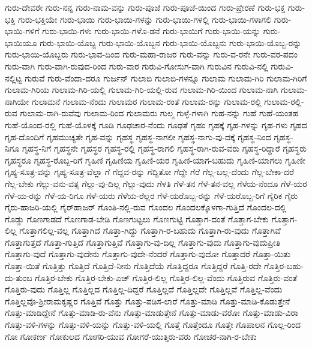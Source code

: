 {ಗುರು-ದೇವರೇ
ಗುರು-ನನ್ನ
ಗುರು-ನಾಮ-ವನ್ನು
ಗುರು-ಪೂಜೆ
ಗುರು-ಪೂಜೆ-ಯಿಂದ
ಗುರು-ಪ್ರೇರಣೆ
ಗುರು-ಭಕ್ತ
ಗುರು-ಭಕ್ತಿ
ಗುರು-ಭಕ್ತಿಯೇ
ಗುರು-ಭಾಯಿ
ಗುರು-ಭಾಯಿ-ಗಳನ್ನು
ಗುರು-ಭಾಯಿ-ಗಳಲ್ಲಿ
ಗುರು-ಭಾಯಿ-ಗಳಾಗಲಿ
ಗುರು-ಭಾಯಿ-ಗಳಿಗೆ
ಗುರು-ಭಾಯಿ-ಗಳು
ಗುರು-ಭಾಯಿ-ಗಳೊ-ಡನೆ
ಗುರು-ಭಾಯಿಗೆ
ಗುರು-ಭಾಯಿ-ಯನ್ನು
ಗುರು-ಭಾಯಿಯೂ
ಗುರು-ಭಾಯಿ-ಯೊಬ್ಬ
ಗುರು-ಭಾಯಿ-ಯೊಬ್ಬನ
ಗುರು-ಭಾಯಿ-ಯೊಬ್ಬನು
ಗುರು-ಭಾಯಿ-ಯೊಬ್ಬ-ರನ್ನು
ಗುರು-ಭಾಯಿ-ಯೊಬ್ಬರು
ಗುರು-ಭಾವ-ದಿಂದ
ಗುರು-ಮಹಾ-ರಾಜರ
ಗುರು-ವನ್ನು
ಗುರು-ವ-ರನೇ
ಗುರು-ವರ-ಪದಂ
ಗುರು-ವಾಗಿ
ಗುರು-ವಾಗಿ-ರುವುದ-ರಿಂದ
ಗುರು-ವಾರ
ಗುರುವಿ-ಗೋಸುಗ-ವಾಗಿ
ಗುರುವಿನ
ಗುರುವಿ-ನಲ್ಲಿ
ಗುರುವಿ-ನಲ್ಲಿಟ್ಟ
ಗುರುವೆ
ಗುರು-ವೆಂದಾ-ದರೂ
ಗುರ್ಜನ್
ಗುಲಾಬಿ
ಗುಲಾಬಿ-ಗಳನ್ನೂ
ಗುಲಾಮ
ಗುಲಾಮ-ಗಿರಿ
ಗುಲಾಮ-ಗಿರಿಗೆ
ಗುಲಾಮ-ಗಿರಿಯ
ಗುಲಾಮ-ಗಿರಿ-ಯಲ್ಲಿ
ಗುಲಾಮ-ಗಿರಿ-ಯಲ್ಲಿ-ರುವ
ಗುಲಾಮ-ಗಿರಿ-ಯಿಂದ
ಗುಲಾಮ-ನಾಗಿ
ಗುಲಾಮ-ನಾಗಿಯೇ
ಗುಲಾಮನೆ
ಗುಲಾಮ-ನೆಂದು
ಗುಲಾಮರ
ಗುಲಾಮ-ರಂತೆ
ಗುಲಾಮ-ರನ್ನು
ಗುಲಾಮ-ರಲ್ಲಿ
ಗುಲಾಮ-ರಲ್ಲಿ-ರುವ
ಗುಲಾಮ-ರಾಗಿ-ರುವೆವು
ಗುಲಾಮ-ರಿಂದ
ಗುಲಾಮರು
ಗುಲ್ಮ
ಗುಳ್ಳೆ-ಗಳಾಗಿ
ಗುಹ-ನನ್ನು
ಗುಹೆ
ಗುಹೆ-ಯಂತಹ
ಗುಹೆ-ಯೊಂದ-ರಲ್ಲಿ
ಗುಹೆ-ಯೊಳಕ್ಕೆ
ಗೂಡಿ
ಗೂಢಚಾರ-ನೆಂದು
ಗೂಢತೆ
ಗೃಹಂ
ಗೃಹಕ್ಕೆ
ಗೃಹ-ಗಳನ್ನು
ಗೃಹ-ಗಳು
ಗೃಹದ
ಗೃಹ-ದೊಂದಿಗೆ
ಗೃಹಮುಚ್ಯತೇ
ಗೃಹ-ವನ್ನು
ಗೃಹಸ್ಥ
ಗೃಹಸ್ಥ-ನಾಗಲೀ
ಗೃಹಸ್ಥ-ನಾಗು-ವು-ದಕ್ಕೆ
ಗೃಹಸ್ಥ-ನಿಂದ
ಗೃಹಸ್ಥ-ನಿಗೂ
ಗೃಹಸ್ಥ-ನಿಗೆ
ಗೃಹಸ್ಥನೇ
ಗೃಹಸ್ಥರ
ಗೃಹಸ್ಥ-ರಲ್ಲಿ
ಗೃಹಸ್ಥ-ರಾಗಲಿ
ಗೃಹಸ್ಥ-ರಾಗಿ-ರುವ-ವರು
ಗೃಹಸ್ಥ-ರಿದ್ದಾರೆ
ಗೃಹಸ್ಥರು
ಗೃಹಸ್ಥರೂ
ಗೃಹಸ್ಥ-ರೊಬ್ಬ-ರಿಗೆ
ಗೃಹಿಣಿ
ಗೃಹಿಣಿಯ
ಗೃಹಿಣಿ-ಯರ
ಗೃಹಿಣಿ-ಯಾಗ-ಬಹುದು
ಗೃಹಿಣಿ-ಯಾಗಲು
ಗೃಹಿಣೀ
ಗೃಹ್ಯ-ಸೂತ್ರ-ವನ್ನು
ಗೃಹ್ಯ-ಸೂತ್ರ-ವೆಲ್ಲಾ
ಗೆ
ಗೆದ್ದವ-ರನ್ನು
ಗೆದ್ದಿತೋ
ಗೆದ್ದೇ
ಗೆರೆ
ಗೆಲ್ಲ-ಬಲ್ಲ-ದೆಂದು
ಗೆಲ್ಲ-ಬೇಕಾ-ದರೆ
ಗೆಲ್ಲ-ಬೇಕು
ಗೆಲ್ಲು-ವನು-ವತ್ಸ
ಗೆಲ್ಲು-ವು-ದಿಲ್ಲ
ಗೆಲ್ಲು-ವುದು
ಗೆಳತಿ
ಗೆಳೆ-ತನ
ಗೆಳೆ-ತನ-ವಲ್ಲ
ಗೆಳೆಯ-ನೆಂದೂ
ಗೆಳೆ-ಯರ
ಗೆಳೆ-ಯ-ರನ್ನು
ಗೆಳೆ-ಯ-ರಿಗೂ
ಗೆಳೆ-ಯರು
ಗೆಳೆಯ-ರೆಲ್ಲರ
ಗೆಳೆ-ಯರೊಬ್ಬ-ರನ್ನು
ಗೆಳೆ-ಯರೊಬ್ಬ-ರಿಗೆ
ಗೈರಿಕ
ಗೈರು
ಗೈರು-ಹಾಜರಿ-ಯಲ್ಲಿ
ಗೈರ್‌ಹಾಜರ್
ಗೊಂತಿ-ನಲ್ಲಿ-ರುವ
ಗೊಂದಲ
ಗೊಂದಲಕ್ಕೊಳಗಾ-ಗುತ್ತಿದೆ
ಗೊಂದಲ-ದಲ್ಲಿ
ಗೊಡ್ಡು
ಗೊಣಗಾಡದೆ
ಗೊಣಗಾಡ-ಬೇಡಿ
ಗೊಣಗುಟ್ಟಲು
ಗೊಣಗುಟ್ಟಿ
ಗೊತ್ತಾಗ-ದಂತೆ
ಗೊತ್ತಾಗ-ಬೇಕು
ಗೊತ್ತಾಗ-ಲಿಲ್ಲ
ಗೊತ್ತಾಗಲಿಲ್ಲ-ವಲ್ಲ
ಗೊತ್ತಾಗಿದೆ
ಗೊತ್ತಾ-ಗಿದ್ದು
ಗೊತ್ತಾಗಿ-ರ-ಬಹುದು
ಗೊತ್ತಾಗಿ-ರು-ವುದು
ಗೊತ್ತಾಗಿವೆ
ಗೊತ್ತಾಗುತ್ತದೆ
ಗೊತ್ತಾ-ಗುತ್ತಿದೆ
ಗೊತ್ತಾಗುತ್ತಿವೆ
ಗೊತ್ತಾಗು-ವು-ದಿಲ್ಲ
ಗೊತ್ತಾಗು-ವುದು
ಗೊತ್ತಾಗು-ವುದುಪ್ರೀತಿ
ಗೊತ್ತಾಗು-ವುದೆ
ಗೊತ್ತಾಗು-ವುದೇನು
ಗೊತ್ತಾಗು-ವುದೇ-ನೆಂದರೆ
ಗೊತ್ತಾಗು-ವುದೋ
ಗೊತ್ತಾದರೆ
ಗೊತ್ತಾ-ಯಿತು
ಗೊತ್ತಾ-ಯಿತೆ
ಗೊತ್ತಿತ್ತು
ಗೊತ್ತಿದೆ
ಗೊತ್ತಿದೆ-ನೀನು
ಗೊತ್ತಿದೆಯೆ
ಗೊತ್ತಿದ್ದರೂ
ಗೊತ್ತಿದ್ದರೆ
ಗೊತ್ತಿ-ರದೇ
ಗೊತ್ತಿರ-ಬಹು-ದು-ತುಂಬ
ಗೊತ್ತಿರ-ಬೇಕು
ಗೊತ್ತಿರ-ಬೇಕು-ಎಚ್
ಗೊತ್ತಿರ-ಲಿಲ್ಲ
ಗೊತ್ತಿರ-ಲಿಲ್ಲ-ವೆಂದು
ಗೊತ್ತಿರುವ
ಗೊತ್ತಿರು-ವಂತೆ
ಗೊತ್ತಿರು-ವುದು
ಗೊತ್ತಿಲ್ಲ
ಗೊತ್ತಿಲ್ಲದ
ಗೊತ್ತಿಲ್ಲ-ದಿದ್ದರೆ
ಗೊತ್ತಿಲ್ಲದೆ
ಗೊತ್ತಿಲ್ಲದೇ
ಗೊತ್ತಿಲ್ಲವೆ
ಗೊತ್ತಿಲ್ಲ-ವೆಂದು
ಗೊತ್ತಿಲ್ಲವೊ-ಶ್ರೀರಾಮಕೃಷ್ಣರ
ಗೊತ್ತಿವೆ
ಗೊತ್ತು
ಗೊತ್ತು-ಪಡಿಸ-ಲಾರೆ
ಗೊತ್ತು-ಮಾಡಿ
ಗೊತ್ತು-ಮಾಡಿ-ಕೊಡುತ್ತೇನೆ
ಗೊತ್ತು-ಮಾಡಿದ್ದೇನೆ
ಗೊತ್ತು-ಮಾಡಿ-ರು-ವೆನು
ಗೊತ್ತು-ಮಾಡುತ್ತೇನೆ
ಗೊತ್ತು-ಮಾಡು-ವರೋ
ಗೊತ್ತು-ಮಾಡು-ವಿರಾ
ಗೊತ್ತು-ವಳಿ-ಗಳನ್ನು
ಗೊತ್ತು-ವಳಿ-ಯನ್ನು
ಗೊತ್ತು-ವಳಿ-ಯಲ್ಲಿ
ಗೊತ್ತೆ
ಗೊತ್ತೆಂದೂ
ಗೊತ್ತೇ
ಗೊಪಾಲನ
ಗೊಲ್ಲ-ರಿಂದ
ಗೋ
ಗೋಕರ್ಣ
ಗೋಕುಲದ
ಗೋಗರಿ-ಯುವ
ಗೋಗರೆ-ಯುತ್ತಿರು-ವರು
ಗೋಚರ-ನಾಗಿ-ರ-ಬೇಕು
}
